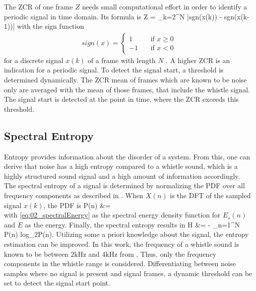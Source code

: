 The \ac{ZCR} of one frame $Z$ needs small computational effort in order to
identify a periodic signal in time domain.
Its formula is
\bal
    Z = \sum_{k=2}^N |sgn(x(k)) - sgn(x(k-1))|
    \label{eq:02_zcr}
\eal
with the sign function
\begin{align*}
    sign(x) =
    \begin{cases}
        1 & \quad \text{if } x\geq 0 \\
        -1 & \quad \text{if } x < 0
    \end{cases}
\end{align*}
for a discrete signal $x(k)$ of a frame with length $N$ \cite{Z_W_voiceActivity}.
A higher \ac{ZCR} is an indication for a periodic signal.
To detect the signal start, a threshold is determined dynamically.
The \ac{ZCR} mean of frames which are known to be noise only
are averaged with the mean of those frames, that include the whistle signal.
The signal start is detected at the point in time, where the \ac{ZCR} exceeds
this threshold.

\subsection{Spectral Entropy}
\label{subsec:02_Entropy}

Entropy provides information about the disorder of a system.
From this, one can derive that noise has a high entropy compared to
a whistle sound, which is a highly structured sound signal and a high
amount of information accordingly.
The spectral entropy of a signal is determined by normalizing the
\ac{PDF} over all frequency components as described in \cite{S_J_entropy}.
When $X(n)$ is the \ac{DFT} of the sampled signal $x(k)$, the \ac{PDF} is
\bal
    P(n) &= 
    \label{eq:02_pdf}\\
\eal
with \cref{eq:02_spectralEnergy} as the spectral energy density function for $E_s(n)$
and $E$ as the energy.
Finally, the spectral entropy results in
\bal
    H &= - \sum_{n=1}^N P(n) log_2P(n).
    \label{eq:02_entropy}
\eal
Utilizing some a priori knowledge about the signal, the entropy estimation
can be improved.
In this work, the frequency of a whistle sound is known to be
between $2\si{\kilo\hertz}$ and $4\si{\kilo\hertz}$ from \cite{Hasselbring},
Thus, only the frequency components in the whistle range is considered.
Differentiating between noise samples where no signal is present and
signal frames, a dynamic threshold can be set to detect the signal start point.